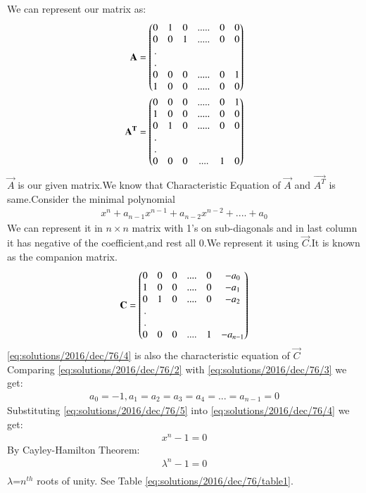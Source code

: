 We can represent our matrix as:
\begin{align}
    \mathbf{A}=\begin{pmatrix}0&1&0&.....&0&0\\0&0&1&.....&0&0\\.\\.\\0&0& 0&.....&0&1\\1&0&0&.....&0&0\end{pmatrix}\label{eq:solutions/2016/dec/76/1}\\
    \mathbf{A^T}=\begin{pmatrix}0&0&0&.....&0&1\\1&0&0&.....&0&0\\0&1& 0&.....&0&0\\.\\.\\0&0&0&....&1&0\end{pmatrix}\label{eq:solutions/2016/dec/76/2}
    \end{align}
$\vec{A}$ is our given matrix.We know that Characteristic Equation of $\vec{A}$ and $\vec{A^T}$ is same.Consider the minimal polynomial
\begin{align}
    x^n+a_{n-1}x^{n-1}+a_{n-2}x^{n-2}+....+a_0\label{eq:solutions/2016/dec/76/4}
\end{align}
We can represent it in $n\times n$ matrix with 1's on sub-diagonals and in last column it has negative of the coefficient,and rest all 0.We represent it using $\vec{C}$.It is known as the companion matrix.
\begin{align}
     \mathbf{C}=\begin{pmatrix}0&0&0&....&0&-a_0\\1&0&0&....&0&-a_1\\0&1& 0&....&0&-a_2\\.\\.\\0&0&0&....&1&-a_{n-1}\end{pmatrix}\label{eq:solutions/2016/dec/76/3}
\end{align}
\eqref{eq:solutions/2016/dec/76/4} is also the characteristic equation of $\vec{C}$\\
Comparing \eqref{eq:solutions/2016/dec/76/2} with \eqref{eq:solutions/2016/dec/76/3} we get:
\begin{align}
    a_0=-1, a_1=a_2=a_3=a_4=...=a_{n-1}=0\label{eq:solutions/2016/dec/76/5}
\end{align}
Substituting \eqref{eq:solutions/2016/dec/76/5} into \eqref{eq:solutions/2016/dec/76/4} we get:
\begin{align}
    x^n-1=0\label{eq:solutions/2016/dec/76/6}
\end{align}
By Cayley-Hamilton Theorem:
\begin{align}
    \lambda^n-1=0\\
\end{align}
 $\lambda$=$n^{th}$ roots of unity. See Table \ref{eq:solutions/2016/dec/76/table1}.

